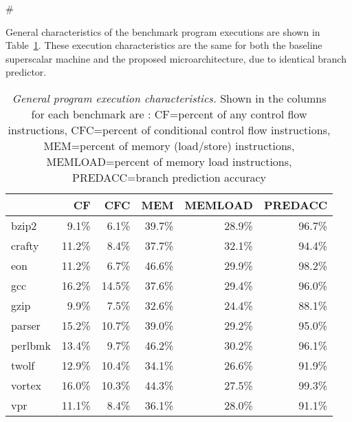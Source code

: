 #\documentclass[10pt,dvips]{article}
\begin{document}
General characteristics of the benchmark program
executions are shown in Table~\ref{tab:general}.
These execution characteristics are the same for 
both the baseline superscalar machine
and the proposed microarchitecture, due to identical 
branch predictor.
%
\begin{table}[p]
\begin{center}
\caption{{\em General program execution characteristics.}
Shown in the columns for each benchmark are :
CF=percent of any control flow instructions, 
CFC=percent of conditional control flow instructions, 
MEM=percent of memory (load/store) instructions,
MEMLOAD=percent of memory load instructions, 
PREDACC=branch prediction accuracy}
\label{tab:general}
\vspace{+0.1in}
\scriptsize {
\begin{tabular}{|l||r|r|r|r|r|}
\hline 
 & CF & CFC & MEM & MEMLOAD & PREDACC \\
\hline

\hline
bzip2&
9.1\%	& 6.1\%	& 39.7\%	& 28.9\%	& 96.7\% \\

\hline
crafty&
11.2\%	& 8.4\%	& 37.7\%	& 32.1\%	& 94.4\% \\

\hline
eon&
11.2\%	& 6.7\%	& 46.6\%	& 29.9\%	& 98.2\% \\

\hline
gcc&
16.2\%	& 14.5\%	& 37.6\%	& 29.4\%	& 96.0\% \\

\hline
gzip&
9.9\%	& 7.5\%	& 32.6\%	& 24.4\%	& 88.1\% \\

\hline
parser&
15.2\%	& 10.7\%	& 39.0\%	& 29.2\%	& 95.0\% \\

\hline
perlbmk&
13.4\%	& 9.7\%	& 46.2\%	& 30.2\%	& 96.1\% \\

\hline
twolf&
12.9\%	& 10.4\%	& 34.1\%	& 26.6\%	& 91.9\% \\

\hline
vortex&
16.0\%	& 10.3\%	& 44.3\%	& 27.5\%	& 99.3\% \\

\hline
vpr&
11.1\%	& 8.4\%	& 36.1\%	& 28.0\%	& 91.1\% \\

\hline
\end{tabular}
}
\end{center}
\end{table}
%
\end{document}
